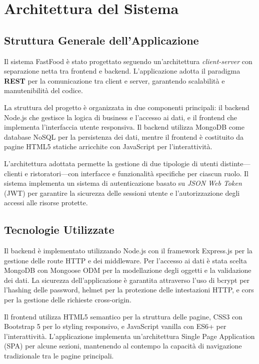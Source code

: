 \documentclass[12pt,a4paper]{article}
\begin{document}
\newpage

\section{Architettura del Sistema}

\subsection{Struttura Generale dell'Applicazione}

Il sistema FastFood è stato progettato seguendo un'architettura \textit{client-server} con separazione netta tra frontend e backend. L'applicazione adotta il paradigma \textbf{REST} per la comunicazione tra client e server, garantendo scalabilità e manutenibilità del codice.

La struttura del progetto è organizzata in due componenti principali: il backend Node.js che gestisce la logica di business e l'accesso ai dati, e il frontend che implementa l'interfaccia utente responsiva. Il backend utilizza MongoDB come database NoSQL per la persistenza dei dati, mentre il frontend è costituito da pagine HTML5 statiche arricchite con JavaScript per l'interattività.

L'architettura adottata permette la gestione di due tipologie di utenti distinte---clienti e ristoratori---con interfacce e funzionalità specifiche per ciascun ruolo. Il sistema implementa un sistema di autenticazione basato su \textit{JSON Web Token} (JWT) per garantire la sicurezza delle sessioni utente e l'autorizzazione degli accessi alle risorse protette.

\subsection{Tecnologie Utilizzate}

Il backend è implementato utilizzando Node.js con il framework Express.js per la gestione delle route HTTP e dei middleware. Per l'accesso ai dati è stata scelta MongoDB con Mongoose ODM per la modellazione degli oggetti e la validazione dei dati. La sicurezza dell'applicazione è garantita attraverso l'uso di bcrypt per l'hashing delle password, helmet per la protezione delle intestazioni HTTP, e cors per la gestione delle richieste cross-origin.

Il frontend utilizza HTML5 semantico per la struttura delle pagine, CSS3 con Bootstrap 5 per lo styling responsivo, e JavaScript vanilla con ES6+ per l'interattività. L'applicazione implementa un'architettura Single Page Application (SPA) per alcune sezioni, mantenendo al contempo la capacità di navigazione tradizionale tra le pagine principali.
\end{document}
